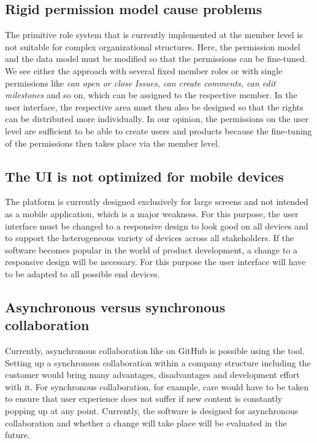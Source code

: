 \subsection*{Rigid permission model cause problems}

The primitive role system that is currently implemented at the member level is not suitable for complex organizational structures. Here, the permission model and the data model must be modified so that the permissions can be fine-tuned. We see either the approach with several fixed member roles or with single permissions like \textit{can open or close Issues, can create comments, can edit milestones} and so on, which can be assigned to the respective member. In the user interface, the respective area must then also be designed so that the rights can be distributed more individually. In our opinion, the permissions on the user level are sufficient to be able to create users and products because the fine-tuning of the permissions then takes place via the member level.

\subsection*{The UI is not optimized for mobile devices}

The platform is currently designed exclusively for large screens and not intended as a mobile application, which is a major weakness. For this purpose, the user interface must be changed to a responsive design to look good on all devices and to support the heterogeneous variety of devices across all stakeholders. If the software becomes popular in the world of product development, a change to a responsive design will be necessary. For this purpose the user interface will have to be adapted to all possible end devices.

\subsection*{Asynchronous versus synchronous collaboration}

Currently, asynchronous collaboration like on GitHub is possible using the tool. Setting up a synchronous collaboration within a company structure including the customer would bring many advantages, disadvantages and development effort with it. For synchronous collaboration, for example, care would have to be taken to ensure that user experience does not suffer if new content is constantly popping up at any point. Currently, the software is designed for asynchronous collaboration and whether a change will take place will be evaluated in the future.

